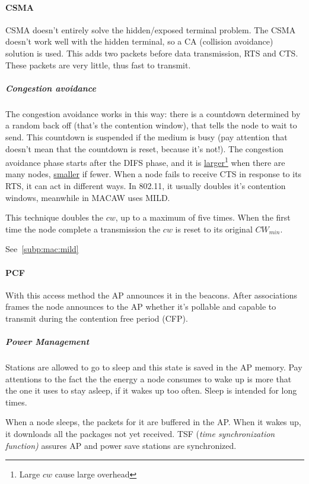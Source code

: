 \paragraph*{CSMA} CSMA doesn't entirely solve the hidden/exposed terminal
problem. The CSMA doesn't work well with the hidden terminal, so a CA
(collision avoidance) solution is used. This adds two packets before data
transmission, RTS and CTS. These packets are very little, thus fast to transmit.

\subparagraph*{Congestion avoidance} The congestion avoidance works in this way:
there is a countdown determined by a random back off (that's the contention
window), that tells the node to wait to send. This countdown is suspended if the
medium is busy (pay attention that doesn't mean that the countdown is reset,
because it's not!). The congestion avoidance phase starts after the DIFS phase,
and it is \underline{larger}\footnote{Large $cw$ cause large overhead} when
there are many nodes, \underline{smaller} if fewer. When a node fails to receive
CTS in response to its RTS, it can act in different ways. In 802.11, it usually
doubles it's contention windows, meanwhile in MACAW uses MILD.

 This technique doubles the $cw$,
up to a maximum of five times. When the first time the node complete a
transmission the $cw$ is reset to its original $CW_{min}$.

 See~\ref{subp:mac:mild}

\paragraph*{PCF} With this access method the AP announces it in the beacons.
After associations frames the node announces to the AP whether it's pollable
and capable to transmit during the contention free period (CFP).

\subparagraph*{Power Management}
Stations are allowed to go to sleep and this state is saved in the AP memory.
Pay attentions to the fact the the energy a node consumes to wake up is more
that the one it uses to stay asleep, if it wakes up too often. Sleep is intended
for long times.

When a node sleeps, the packets for it are buffered in the AP. When it wakes up,
it downloads all the packages not yet received. TSF (\textit{time
  synchronization function)} assures AP and power save stations are
synchronized.
